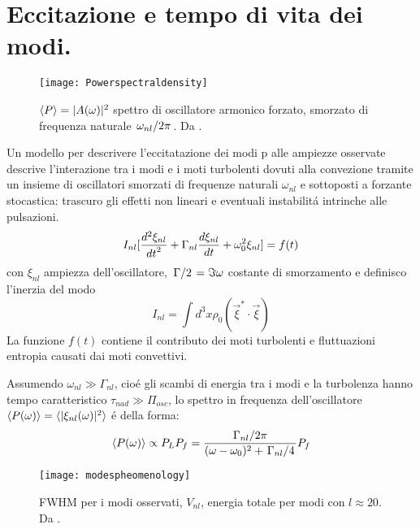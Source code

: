 \documentclass[../main.tex]{subfiles}
\begin{document}
\section{Eccitazione e tempo di vita dei modi.} \label{sec:excitation}

\begin{wrapfigure}[23]{r}{0.5\textwidth}
\centering
\texttt{[image: Powerspectraldensity]}
\caption{$\exv{P}=|A(\omega)|^2$ spettro di oscillatore armonico forzato, smorzato di frequenza naturale $\midfrac{\omega_{nl}}{2\pi}$. Da \cite{houdek2006stochastic}.}\label{fig:Powerspectraldensity}
\end{wrapfigure}

Un modello per descrivere l'eccitatazione dei modi p alle ampiezze osservate descrive l'interazione tra i modi e i moti turbolenti dovuti alla convezione tramite un insieme di oscillatori smorzati di frequenze naturali $\omega_{nl}$ e sottoposti a forzante stocastica: trascuro gli effetti non lineari e eventuali instabilit\'a intrinche alle pulsazioni.
\begin{equation}
I_{nl}[\TtwoDy{t}{\xi_{nl}}+\Gamma_{nl}\TDy{t}{\xi_{nl}}+\omega_0^2\xi_{nl}]=f(t)
\end{equation}
con $\xi_{nl}$ ampiezza dell'oscillatore, $\midfrac{\Gamma}{2}=\Im{\omega}$ costante di smorzamento e definisco l'inerzia del modo
\begin{equation}
I_{nl}=\int d^3x\rho_0(\vec{\xi}^*\cdot\vec{\xi})\label{eq:modeinertia}
\end{equation}
La funzione $f(t)$ contiene il contributo dei moti turbolenti e fluttuazioni entropia causati dai moti convettivi.

Assumendo $\omega_{nl}\gg\Gamma_{nl}$, cio\'e gli scambi di energia tra i modi e la turbolenza hanno tempo caratteristico $\tau_{nad}\gg\Pi_{osc}$, lo spettro in frequenza dell'oscillatore $\exv{P(\omega)}=\exv{|\xi_{nl}(\omega)|^2}$ \'e della forma:
\begin{equation}
\exv{P(\omega)}\propto P_LP_f=\frac{\midfrac{\Gamma_{nl}}{2\pi}}{(\omega-\omega_0)^2+\midfrac{\Gamma_{nl}}{4}}P_f
\end{equation}

\begin{wrapfigure}[20]{r}{0.5\textwidth}
\centering
\texttt{[image: modespheomenology]}
\caption{FWHM per i modi osservati, $V_{nl}$, energia totale per modi con $l\approx20$. Da \cite{libbrecht1988solar}.}\label{fig:modespheomenology}
\end{wrapfigure}
\end{document}
